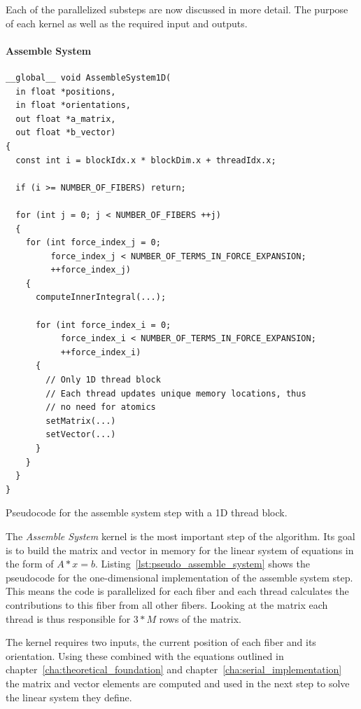 \documentclass[a4paper,11pt]{kth-mag}
\begin{document}
Each of the parallelized substeps are now discussed in more detail. The purpose of each kernel as well as the required input and outputs.

\paragraph{Assemble System}

\begin{listing}[!htbp]
  \centering
  \begin{verbatim}
__global__ void AssembleSystem1D(
  in float *positions,
  in float *orientations,
  out float *a_matrix,
  out float *b_vector)
{
  const int i = blockIdx.x * blockDim.x + threadIdx.x;

  if (i >= NUMBER_OF_FIBERS) return;

  for (int j = 0; j < NUMBER_OF_FIBERS ++j)
  {
    for (int force_index_j = 0;
         force_index_j < NUMBER_OF_TERMS_IN_FORCE_EXPANSION;
         ++force_index_j)
    {
      computeInnerIntegral(...);

      for (int force_index_i = 0;
           force_index_i < NUMBER_OF_TERMS_IN_FORCE_EXPANSION;
           ++force_index_i)
      {
        // Only 1D thread block
        // Each thread updates unique memory locations, thus
        // no need for atomics
        setMatrix(...)
        setVector(...)
      }
    }
  }
}
  \end{verbatim}
  \caption{Pseudocode for the assemble system step with a 1D thread block.}
  \label{lst:pseudo_assemble_system}
\end{listing}

The \emph{Assemble System} kernel is the most important step of the algorithm. Its goal is to build the matrix and vector in memory for the linear system of equations in the form of $A*x = b$. Listing~\ref{lst:pseudo_assemble_system} shows the pseudocode for the one-dimensional implementation of the assemble system step. This means the code is parallelized for each fiber and each thread calculates the contributions to this fiber from all other fibers. Looking at the matrix each thread is thus responsible for $3*M$ rows of the matrix.

The kernel requires two inputs, the current position of each fiber and its orientation. Using these combined with the equations outlined in chapter~\ref{cha:theoretical_foundation} and chapter~\ref{cha:serial_implementation} the matrix and vector elements are computed and used in the next step to solve the linear system they define.
\end{document}
